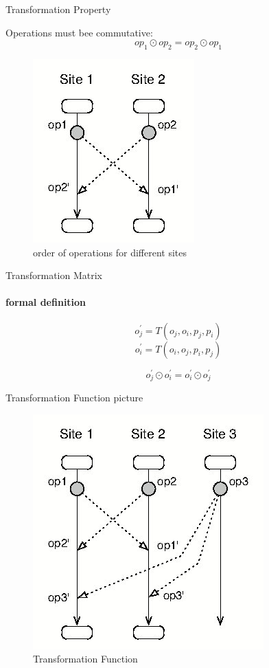 \documentclass{beamer}
\begin{document}
\begin{frame}{Transformation Property}

Operations must bee commutative:
\[op_1 \odot op_2 = op_2 \odot op_1\]

\begin{figure}
	\includegraphics[scale=0.5]{OT-Operations-Order.jpg}
	\caption{order of operations for different sites}
\end{figure}

\end{frame}


\begin{frame}{Transformation Matrix}
\framesubtitle{formal definition}

\[o_{j}^{'} = T(o_j, o_i, p_j, p_i)\]
\[o_{i}^{'} = T(o_i, o_j, p_i, p_j)\]

\[o_{j}^{'} \odot o_{i}^{'} = o_{i}^{'} \odot o_{j}^{'}\]


\end{frame}


\begin{frame}{Transformation Function picture}

\begin{figure}
\includegraphics[scale=0.5]{OT-Transformation-Matrix.jpg}
\caption{Transformation Function}
\end{figure}

\end{frame}
\end{document}
